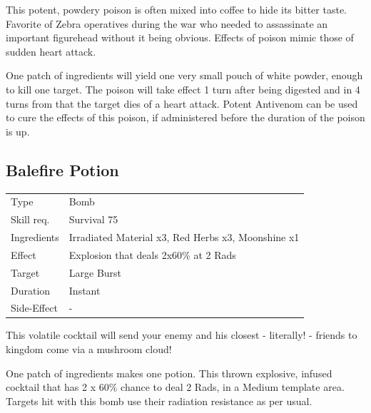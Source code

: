 \documentclass[11pt,a4paper,twocolumn]{book}
\begin{document}
\medskip

This potent, powdery poison is often mixed into coffee to hide its bitter taste. Favorite of Zebra operatives during the war who needed to assassinate an important figurehead without it being obvious. Effects of poison mimic those of sudden heart attack.

One patch of ingredients will yield one very small pouch of white powder, enough to kill one target.
The poison will take effect 1 turn after being digested and in 4 turns from that the target dies of a heart attack.
Potent Antivenom can be used to cure the effects of this poison, if administered before the duration of the poison is up.


\subsection*{Balefire Potion}
{
	\begin{tabu} to 75mm{| X[l,4] | X[l,8] |}
		\hline
		Type 			& Bomb 														\\
        Skill req.	    & Survival 75 												\\
        Ingredients     & Irradiated Material x3, Red Herbs x3, Moonshine x1		\\
        Effect     		& Explosion that deals 2x60\% at 2 Rads 					\\
        Target      	& Large Burst												\\
        Duration  		& Instant	 												\\
        Side-Effect     & -															\\ \hline
	\end{tabu}
		
}

\medskip

This volatile cocktail will send your enemy and his closest - literally! - friends to kingdom come via a mushroom cloud!

One patch of ingredients makes one potion.
This thrown explosive, infused cocktail that has 2 x 60\% chance to deal 2 Rads, in a Medium template area. Targets hit with this bomb use their radiation resistance as per usual.
\end{document}
